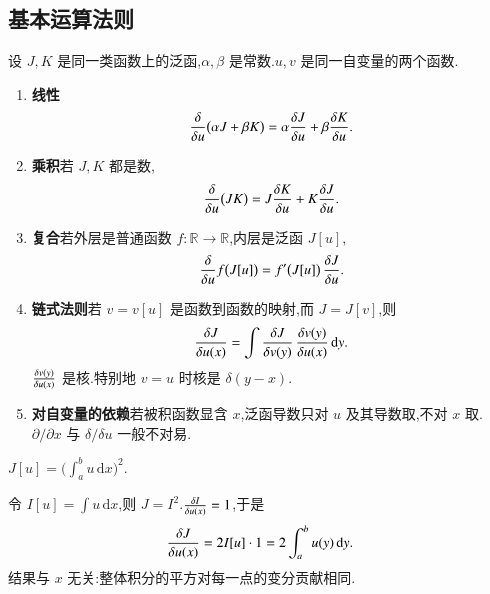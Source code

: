 \subsection{基本运算法则}
设 $J,K$ 是同一类函数上的泛函,$\alpha,\beta$ 是常数.$u,v$ 是同一自变量的两个函数.

\begin{enumerate}
  \item \textbf{线性}
  \begin{equation}
    \frac{\delta {}}{\delta {u}}\bigl(\alpha J+\beta K\bigr)
    =\alpha\frac{\delta {J}}{\delta {u}}+\beta\frac{\delta {K}}{\delta {u}}.
  \end{equation}

  \item \textbf{乘积}若 $J,K$ 都是数,
  \begin{equation}
    \frac{\delta {}}{\delta {u}}\bigl(JK\bigr)
    =J\frac{\delta {K}}{\delta {u}}+K\frac{\delta {J}}{\delta {u}}.
  \end{equation}

  \item \textbf{复合}若外层是普通函数 $f:\mathbb{R}\to\mathbb{R}$,内层是泛函 $J[u]$,
  \begin{equation}
    \frac{\delta {}}{\delta {u}}f\bigl(J[u]\bigr)
    =f'\bigl(J[u]\bigr)\,\frac{\delta {J}}{\delta {u}}.
  \end{equation}

  \item \textbf{链式法则}若 $v=v[u]$ 是函数到函数的映射,而 $J=J[v]$,则
  \begin{equation}
    \frac{\delta {J}}{\delta {u(x)}}
    =\int\frac{\delta {J}}{\delta {v(y)}}\,\frac{\delta {v(y)}}{\delta {u(x)}}\,\mathrm{d}y.
    \label{eq:fd-chain}
  \end{equation}
  $\frac{\delta {v(y)}}{\delta {u(x)}}$ 是核.特别地 $v=u$ 时核是 $\delta(y-x)$.

  \item \textbf{对自变量的依赖}若被积函数显含 $x$,泛函导数只对 $u$ 及其导数取,不对 $x$ 取.$\partial/\partial x$ 与 $\delta/\delta u$ 一般不对易.
\end{enumerate}

\begin{example}
$J[u]=\bigl(\int_a^b u\,\mathrm{d}x\bigr)^2$.
\end{example}
\begin{solution}
令 $I[u]=\int u\,\mathrm{d}x$,则 $J=I^2$.$\frac{\delta {I}}{\delta {u(x)}}=1$,于是
\begin{equation}
  \frac{\delta {J}}{\delta {u(x)}}=2I[u]\cdot 1=2\int_a^b u(y)\,\mathrm{d}y.
\end{equation}
结果与 $x$ 无关:整体积分的平方对每一点的变分贡献相同.
\end{solution}

